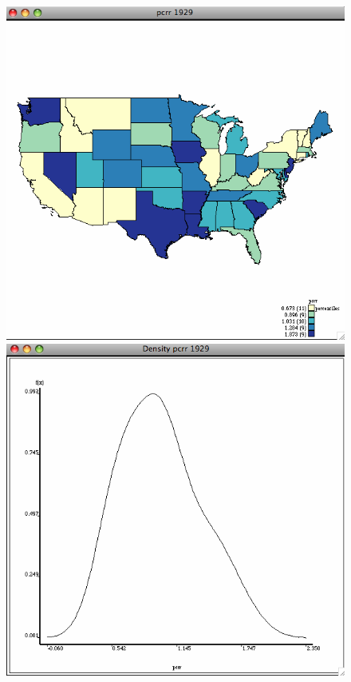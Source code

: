 \documentclass[nototal,handout]{beamer}
\begin{document}
\begin{frame}
\begin{figure}[ht]
\begin{minipage}[b]{0.4\linewidth}
  \end{minipage}
 \begin{minipage}[b]{0.4\linewidth}
  \centering
  \includegraphics[scale=0.20]{income29random.png}
  \end{minipage}
 \begin{minipage}[b]{0.4\linewidth}
  \centering
  \includegraphics[scale=0.20]{density29random.png}
  \end{minipage}
  \end{figure}
 \end{frame} 
\end{document}
